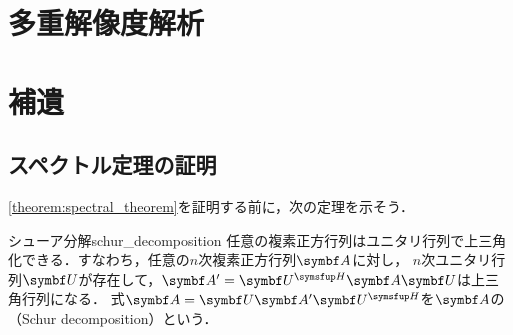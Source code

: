 \documentclass[../../main]{subfiles}
\begin{document}
\section{多重解像度解析}

\section{補遺}

\subsection{スペクトル定理の証明}
\label{subsection:proof_of_the_spectral_theorem}

\cref{theorem:spectral_theorem}を証明する前に，次の定理を示そう．

\begin{theorem}{シューア分解}{schur_decomposition}
  任意の複素正方行列はユニタリ行列で上三角化できる．すなわち，任意の\(n\)次複素正方行列\(\mat{A}\)に対し，
  \(n\)次ユニタリ行列\(\mat{U}\)が存在して，\(\mat{A}'=\htrps{\mat{U}}\mat{A}\mat{U}\)は上三角行列\footnotemark になる．
  式\(\mat{A}=\mat{U}\mat{A}'\htrps{\mat{U}}\)を\(\mat{A}\)の（Schur decomposition）という．
\end{theorem}
\end{document}
